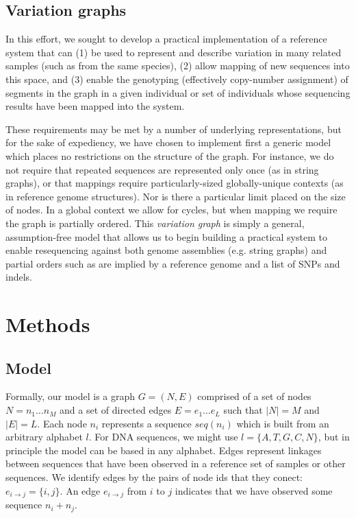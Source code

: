\documentclass{article}
\begin{document}
\subsection{Variation graphs}

In this effort, we sought to develop a practical implementation of a reference system that can (1) be used to represent and describe variation in many related samples (such as from the same species), (2) allow mapping of new sequences into this space, and (3) enable the genotyping (effectively copy-number assignment) of segments in the graph in a given individual or set of individuals whose sequencing results have been mapped into the system.

These requirements may be met by a number of underlying representations, but for the sake of expediency, we have chosen to implement first a generic model which places no restrictions on the structure of the graph. For instance, we do not require that repeated sequences are represented only once (as in string graphs), or that mappings require particularly-sized globally-unique contexts (as in reference genome structures). Nor is there a particular limit placed on the size of nodes. In a global context we allow for cycles, but when mapping we require the graph is partially ordered. This \emph{variation graph} is simply a general, assumption-free model that allows us to begin building a practical system to enable resequencing against both genome assemblies (e.g. string graphs) and partial orders such as are implied by a reference genome and a list of SNPs and indels.

\section{Methods}

\subsection{Model}

Formally, our model is a graph $G = ( N, E )$ comprised of a set of nodes $N = n_1 \ldots n_M$ and a set of directed edges $E = e_1 \ldots e_L$ such that $|N| = M$ and $|E| = L$. Each node $n_i$ represents a sequence $seq(n_i)$ which is built from an arbitrary alphabet $l$.
For DNA sequences, we might use $l = \{ A, T, G, C, N \}$, but in principle the model can be based in any alphabet.
Edges represent linkages between sequences that have been observed in a reference set of samples or other sequences. We identify edges by the pairs of node ids that they conect: $e_{i \rightarrow j} = \{ i, j \}$.
An edge $e_{i \rightarrow j}$ from $i$ to $j$ indicates that we have observed some sequence $n_i + n_j$.
\end{document}
